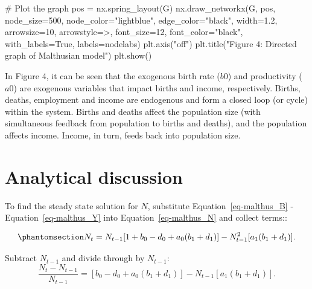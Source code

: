 \documentclass[
  letterpaper,
  DIV=11,
  numbers=noendperiod]{scrreprt}
\newenvironment{Shaded}{\begin{snugshade}}{\end{snugshade}}
\newcommand{\CommentTok}[1]{\textcolor[rgb]{0.37,0.37,0.37}{#1}}
\newcommand{\DecValTok}[1]{\textcolor[rgb]{0.68,0.00,0.00}{#1}}
\newcommand{\FloatTok}[1]{\textcolor[rgb]{0.68,0.00,0.00}{#1}}
\newcommand{\NormalTok}[1]{\textcolor[rgb]{0.00,0.23,0.31}{#1}}
\newcommand{\OperatorTok}[1]{\textcolor[rgb]{0.37,0.37,0.37}{#1}}
\newcommand{\StringTok}[1]{\textcolor[rgb]{0.13,0.47,0.30}{#1}}
\newcommand{\VariableTok}[1]{\textcolor[rgb]{0.07,0.07,0.07}{#1}}
\begin{document}
\begin{tcolorbox}
\begin{Shaded}
\begin{Highlighting}[]
\CommentTok{\# Plot the graph}
\NormalTok{pos }\OperatorTok{=}\NormalTok{ nx.spring\_layout(G)}
\NormalTok{nx.draw\_networkx(G, pos, node\_size}\OperatorTok{=}\DecValTok{500}\NormalTok{, node\_color}\OperatorTok{=}\StringTok{"lightblue"}\NormalTok{, }
\NormalTok{                 edge\_color}\OperatorTok{=}\StringTok{"black"}\NormalTok{, width}\OperatorTok{=}\FloatTok{1.2}\NormalTok{, arrowsize}\OperatorTok{=}\DecValTok{10}\NormalTok{, }
\NormalTok{                 arrowstyle}\OperatorTok{=}\StringTok{\textquotesingle{}{-}\textgreater{}\textquotesingle{}}\NormalTok{, font\_size}\OperatorTok{=}\DecValTok{12}\NormalTok{, font\_color}\OperatorTok{=}\StringTok{"black"}\NormalTok{,}
\NormalTok{                 with\_labels}\OperatorTok{=}\VariableTok{True}\NormalTok{, labels}\OperatorTok{=}\NormalTok{nodelabs)}
\NormalTok{plt.axis(}\StringTok{"off"}\NormalTok{)}
\NormalTok{plt.title(}\StringTok{"Figure 4: Directed graph of Malthusian model"}\NormalTok{)}
\NormalTok{plt.show()}
\end{Highlighting}
\end{Shaded}

\end{tcolorbox}

In Figure 4, it can be seen that the exogenous birth rate (\(b0\)) and
productivity (\(a0\)) are exogenous variables that impact births and
income, respectively. Births, deaths, employment and income are
endogenous and form a closed loop (or cycle) within the system. Births
and deaths affect the population size (with simultaneous feedback from
population to births and deaths), and the population affects income.
Income, in turn, feeds back into population size.

\section{Analytical discussion}\label{analytical-discussion-7}

To find the steady state solution for \(N\), substitute
Equation~\ref{eq-malthus_B} - Equation~\ref{eq-malthus_Y} into
Equation~\ref{eq-malthus_N} and collect terms::

\begin{equation}\phantomsection\label{eq-malthus_N_reduced}{
N_t = N_{t-1}[1+b_0-d_0+a_0(b_1+d_1)] - N_{t-1}^2 [a_1(b_1+d_1)].
}\end{equation}

Subtract \(N_{t-1}\) and divide through by \(N_{t-1}\): \[
\frac{N_t - N_{t-1}}{N_{t-1}} = [b_0-d_0+a_0(b_1+d_1)] - N_{t-1} [a_1(b_1+d_1)].
\]
\end{document}
